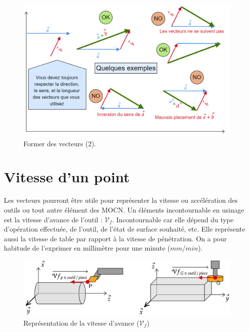 \documentclass[
	11pt, %
	fleqn, %
	a4paper, %
]{LegrandOrangeBook}
\begin{document}
\begin{figure}[H] %
	\centering %
	\includegraphics[width=1\textwidth]{Images/vec11.png} %
	\caption{Former des vecteurs (2).}
	\label{vec11} %
\end{figure}


\section{Vitesse d'un point}
Les vecteurs pourront être utile pour représenter la vitesse ou accélération des outils ou tout autre élément des MOCN. Un éléments incontournable en usinage est la vitesse d'avance de l'outil : $\mathcal{V}_f$. Incontournable car elle dépend du type d'opération effectuée, de l'outil, de l'état de surface souhaité, etc. Elle représente aussi la vitesse de table par rapport à la vitesse de pénétration. On a pour habitude de l'exprimer en millimètre pour une minute ($mm/min$).

\begin{figure}[H]  %
	\centering %
	\includegraphics[width=1\textwidth]{Images/vit1.png} %
    \caption{Représentation de la vitesse d'avance ($\mathcal{V}_f$)}
	\label{vet1} %
\end{figure}
\end{document}
